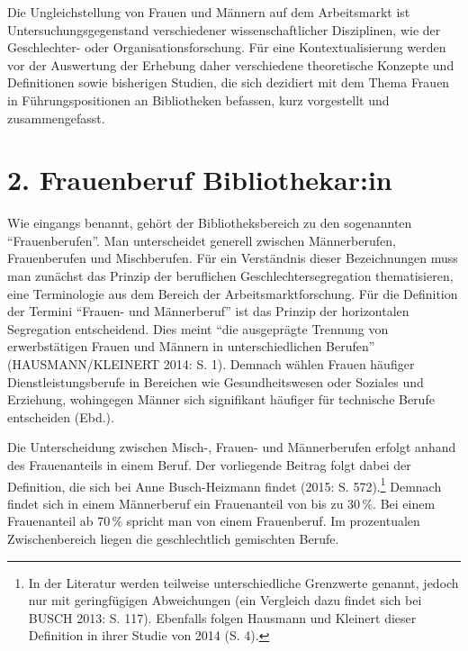 \documentclass[a4paper,
fontsize=11pt,
oneside,
numbers=noperiodatend,
parskip=half-,
bibliography=totoc,
final
]{scrartcl}
\begin{document}
Die Ungleichstellung von Frauen und Männern auf dem Arbeitsmarkt ist
Untersuchungsgegenstand verschiedener wissenschaftlicher Disziplinen,
wie der Geschlechter- oder Organisationsforschung. Für eine
Kontextualisierung werden vor der Auswertung der Erhebung daher
verschiedene theoretische Konzepte und Definitionen sowie bisherigen
Studien, die sich dezidiert mit dem Thema Frauen in Führungspositionen
an Bibliotheken befassen, kurz vorgestellt und zusammengefasst.

\hypertarget{frauenberuf-bibliothekarin}{%
\section{2. Frauenberuf
Bibliothekar:in}\label{frauenberuf-bibliothekarin}}

Wie eingangs benannt, gehört der Bibliotheksbereich zu den sogenannten
\enquote{Frauenberufen}. Man unterscheidet generell zwischen
Männerberufen, Frauenberufen und Mischberufen. Für ein Verständnis
dieser Bezeichnungen muss man zunächst das Prinzip der beruflichen
Geschlechtersegregation thematisieren, eine Terminologie aus dem Bereich
der Arbeitsmarktforschung. Für die Definition der Termini
\enquote{Frauen- und Männerberuf} ist das Prinzip der horizontalen
Segregation entscheidend. Dies meint \enquote{die ausgeprägte Trennung
von erwerbstätigen Frauen und Männern in unterschiedlichen Berufen}
(HAUSMANN/KLEINERT 2014: S. 1). Demnach wählen Frauen häufiger
Dienstleistungsberufe in Bereichen wie Gesundheitswesen oder Soziales
und Erziehung, wohingegen Männer sich signifikant häufiger für
technische Berufe entscheiden (Ebd.).

Die Unterscheidung zwischen Misch-, Frauen- und Männerberufen erfolgt
anhand des Frauenanteils in einem Beruf. Der vorliegende Beitrag folgt
dabei der Definition, die sich bei Anne Busch-Heizmann findet (2015: S.
572).\footnote{In der Literatur werden teilweise unterschiedliche
  Grenzwerte genannt, jedoch nur mit geringfügigen Abweichungen (ein
  Vergleich dazu findet sich bei BUSCH 2013: S. 117). Ebenfalls folgen
  Hausmann und Kleinert dieser Definition in ihrer Studie von 2014 (S.
  4).} Demnach findet sich in einem Männerberuf ein Frauenanteil von bis
zu 30\,\%. Bei einem Frauenanteil ab 70\,\% spricht man von einem
Frauenberuf. Im prozentualen Zwischenbereich liegen die geschlechtlich
gemischten Berufe.
\end{document}
